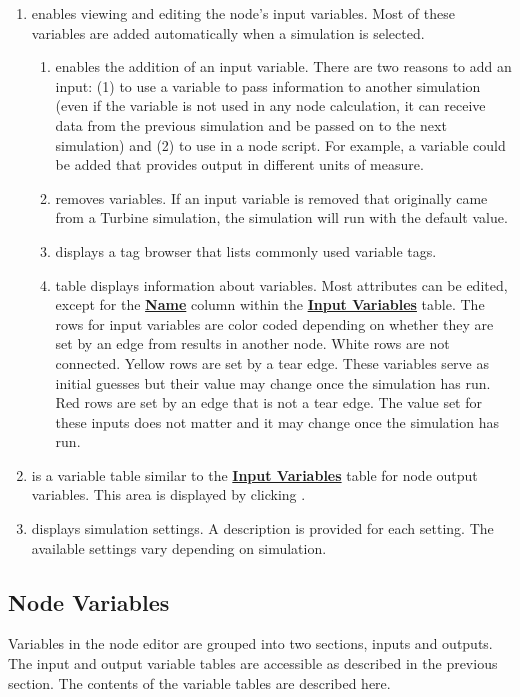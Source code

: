 \begin{enumerate}
	\item {} enables viewing and editing the node's input variables. Most of these variables are added automatically when a simulation is selected.
	\begin{enumerate}
		\item {} enables the addition of an input variable. There are two reasons to add an input: (1) to use a variable to pass information to another simulation (even if the variable is not used in any node calculation, it can receive data from the previous simulation and be passed on to the next simulation) and (2) to use in a node script. For example, a variable could be added that provides output in different units of measure.
		\item {} removes variables. If an input variable is removed that originally came from a Turbine simulation, the simulation will run with the default value.
		\item {} displays a tag browser that lists commonly used variable tags.
		\item {} table displays information about variables. Most attributes can be edited, except for the \textbf{\underline{Name}} column within the \textbf{\underline{Input Variables}} table. The rows for input variables are color coded depending on whether they are set by an edge from results in another node. White rows are not connected. Yellow rows are set by a tear edge. These variables serve as initial guesses but their value may change once the simulation has run. Red rows are set by an edge that is not a tear edge. The value set for these inputs does not matter and it may change once the simulation has run.
	\end{enumerate}
	\item {} is a variable table similar to the \textbf{\underline{Input Variables}} table for node output variables.  This area is displayed by clicking .
	\item {} displays simulation settings. A description is provided for each setting. The available settings vary depending on simulation.
\end{enumerate}

\subsection{Node Variables}
Variables in the node editor are grouped into two sections, inputs and outputs. The input and output variable tables are accessible as described in the previous section.  The contents of the variable tables are described here.

